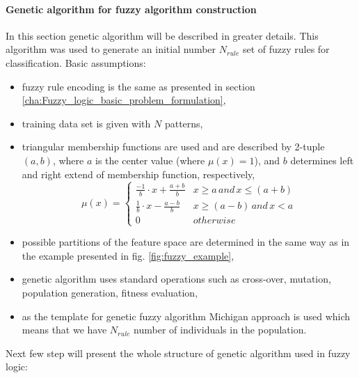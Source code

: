 \paragraph{Genetic algorithm for  fuzzy algorithm construction}
\label{cha:Fuzzy_logic_genetic_algorithm}
In this section genetic algorithm will be described in greater details. This
algorithm was used to generate an initial number $N_{rule}$ set of fuzzy rules for
classification. 
Basic assumptions:
\begin{itemize}
    \item fuzzy rule encoding is the same as presented in section
        \ref{cha:Fuzzy_logic_basic_problem_formulation},
    \item training data set is given with $N$ patterns,
    \item triangular membership functions are used and are described by 2-tuple
        $(a, b)$, where $a$ is the center value (where $\mu(x)=1$), and
        $b$ determines left and right extend of membership function,
        respectively,
        \begin{equation}
            \mu(x) = 
            \begin{cases}
                \frac{-1}{b}\cdot x + \frac{a+b}{b} &
                x \geq a \, and \, x \leq (a+b) \\
                \frac{1}{b}\cdot x - \frac{a-b}{b} &
                x \geq (a - b)\, and\, x < a \\
                0 & otherwise
            \end{cases}
            \label{eq:fuzzy_function}
        \end{equation}
    \item possible partitions of the feature space are determined in the same
        way as in the example presented in fig. \ref{fig:fuzzy_example},
    \item genetic algorithm uses standard operations such as cross-over,
        mutation, population generation, fitness evaluation,
    \item as the template for genetic fuzzy algorithm Michigan approach is
        used which means that we have $N_{rule}$ number of individuals in the
        population.
\end{itemize}
Next few step will present the whole structure of genetic algorithm used in
fuzzy logic:
